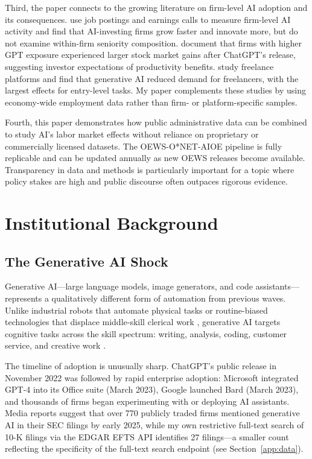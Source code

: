 \documentclass[12pt]{article}
\begin{document}
Third, the paper connects to the growing literature on firm-level AI adoption and its consequences. \citet{babina2024} use job postings and earnings calls to measure firm-level AI activity and find that AI-investing firms grow faster and innovate more, but do not examine within-firm seniority composition. \citet{eisfeldt2023} document that firms with higher GPT exposure experienced larger stock market gains after ChatGPT's release, suggesting investor expectations of productivity benefits. \citet{hui2024} study freelance platforms and find that generative AI reduced demand for freelancers, with the largest effects for entry-level tasks. My paper complements these studies by using economy-wide employment data rather than firm- or platform-specific samples.

Fourth, this paper demonstrates how public administrative data can be combined to study AI's labor market effects without reliance on proprietary or commercially licensed datasets. The OEWS-O*NET-AIOE pipeline is fully replicable and can be updated annually as new OEWS releases become available. Transparency in data and methods is particularly important for a topic where policy stakes are high and public discourse often outpaces rigorous evidence.



\section{Institutional Background}

\subsection{The Generative AI Shock}

Generative AI---large language models, image generators, and code assistants---represents a qualitatively different form of automation from previous waves. Unlike industrial robots that automate physical tasks \citep{acemoglu2020, graetz2018} or routine-biased technologies that displace middle-skill clerical work \citep{autor2003, autor2013}, generative AI targets cognitive tasks across the skill spectrum: writing, analysis, coding, customer service, and creative work \citep{eloundou2024}.

The timeline of adoption is unusually sharp. ChatGPT's public release in November 2022 was followed by rapid enterprise adoption: Microsoft integrated GPT-4 into its Office suite (March 2023), Google launched Bard (March 2023), and thousands of firms began experimenting with or deploying AI assistants. Media reports suggest that over 770 publicly traded firms mentioned generative AI in their SEC filings by early 2025, while my own restrictive full-text search of 10-K filings via the EDGAR EFTS API identifies 27 filings---a smaller count reflecting the specificity of the full-text search endpoint (see Section~\ref{app:data}).
\end{document}
